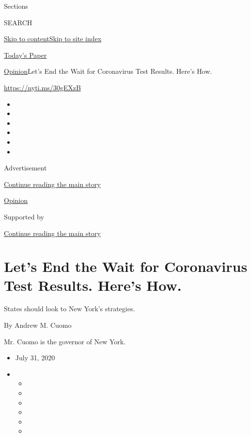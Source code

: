 Sections

SEARCH

\protect\hyperlink{site-content}{Skip to
content}\protect\hyperlink{site-index}{Skip to site index}

\href{https://myaccount.nytimes3xbfgragh.onion/auth/login?response_type=cookie\&client_id=vi}{}

\href{https://www.nytimes3xbfgragh.onion/section/todayspaper}{Today's
Paper}

\href{/section/opinion}{Opinion}\textbar{}Let's End the Wait for
Coronavirus Test Results. Here's How.

\url{https://nyti.ms/30gEXzB}

\begin{itemize}
\item
\item
\item
\item
\item
\item
\end{itemize}

Advertisement

\protect\hyperlink{after-top}{Continue reading the main story}

\href{/section/opinion}{Opinion}

Supported by

\protect\hyperlink{after-sponsor}{Continue reading the main story}

\hypertarget{lets-end-the-wait-for-coronavirus-test-results-heres-how}{%
\section{Let's End the Wait for Coronavirus Test Results. Here's
How.}\label{lets-end-the-wait-for-coronavirus-test-results-heres-how}}

States should look to New York's strategies.

By Andrew M. Cuomo

Mr. Cuomo is the governor of New York.

\begin{itemize}
\item
  July 31, 2020
\item
  \begin{itemize}
  \item
  \item
  \item
  \item
  \item
  \item
  \end{itemize}
\end{itemize}

